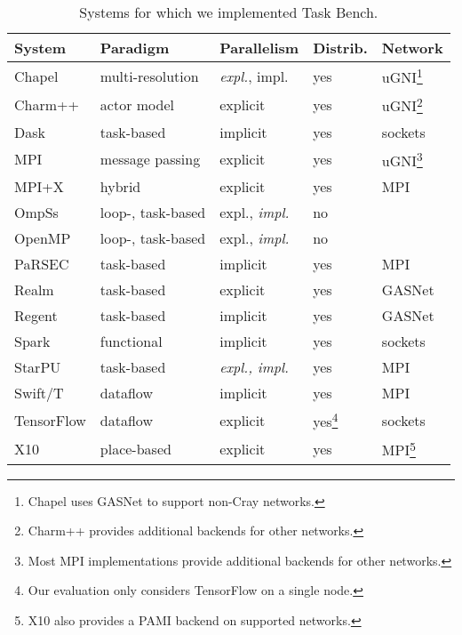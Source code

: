 \begin{table}[t]
\small
\begin{tabular}{@{} l | l | l | l | l @{}}
System & Paradigm & Parallelism & Distrib. & Network \\
\hline
Chapel & multi-resolution & \emph{expl.}, impl. & yes & uGNI\footnote{Chapel uses GASNet to support non-Cray networks.} \\
Charm++ & actor model & explicit & yes & uGNI\footnote{Charm++ provides additional backends for other networks.} \\
Dask & task-based & implicit & yes & sockets \\
MPI & message passing & explicit & yes & uGNI\footnote{Most MPI implementations provide additional backends for other networks.} \\
MPI+X & hybrid & explicit & yes & MPI \\
OmpSs & loop-, task-based & expl., \emph{impl.} & no & \\
OpenMP & loop-, task-based & expl., \emph{impl.} & no & \\
PaRSEC & task-based & implicit & yes & MPI \\
Realm & task-based & explicit & yes & GASNet \\
Regent & task-based & implicit & yes & GASNet \\
Spark & functional & implicit & yes & sockets \\
StarPU & task-based & \emph{expl., impl.} & yes & MPI \\
Swift/T & dataflow & implicit & yes & MPI \\
TensorFlow & dataflow & explicit & yes\footnote{Our evaluation only considers TensorFlow on a single node.} & sockets \\
X10 & place-based & explicit & yes & MPI\footnote{X10 also provides a PAMI backend on supported networks.}
\end{tabular}

\caption{Systems for which we implemented Task Bench.\label{tab:systems}}
\vspace{-0.5cm}
\end{table}

